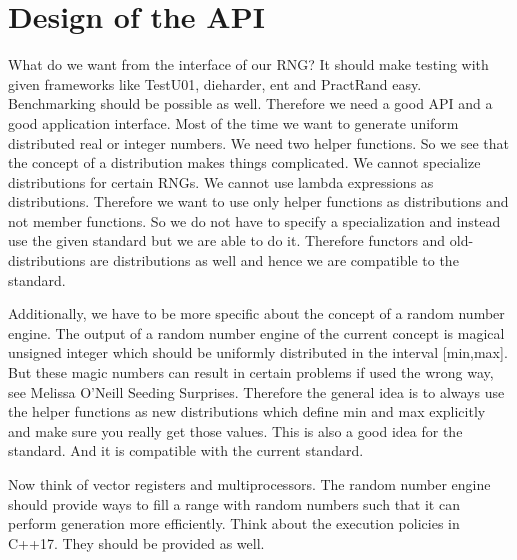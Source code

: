 \documentclass{stdlocal}
\begin{document}
\section{Design of the API} %
\label{sec:design_of_the_api}
  What do we want from the interface of our RNG?
  It should make testing with given frameworks like TestU01, dieharder, ent and PractRand easy.
  Benchmarking should be possible as well.
  Therefore we need a good API and a good application interface.
  Most of the time we want to generate uniform distributed real or integer numbers.
  We need two helper functions.
  So we see that the concept of a distribution makes things complicated.
  We cannot specialize distributions for certain RNGs.
  We cannot use lambda expressions as distributions.
  Therefore we want to use only helper functions as distributions and not member functions.
  So we do not have to specify a specialization and instead use the given standard but we are able to do it.
  Therefore functors and old-distributions are distributions as well and hence we are compatible to the standard.

  Additionally, we have to be more specific about the concept of a random number engine.
  The output of a random number engine of the current concept is magical unsigned integer which should be uniformly distributed in the interval [min,max].
  But these magic numbers can result in certain problems if used the wrong way, see Melissa O'Neill Seeding Surprises.
  Therefore the general idea is to always use the helper functions as new distributions which define min and max explicitly and make sure you really get those values.
  This is also a good idea for the standard.
  And it is compatible with the current standard.

  Now think of vector registers and multiprocessors.
  The random number engine should provide ways to fill a range with random numbers such that it can perform generation more efficiently.
  Think about the execution policies in C++17.
  They should be provided as well.
\end{document}
